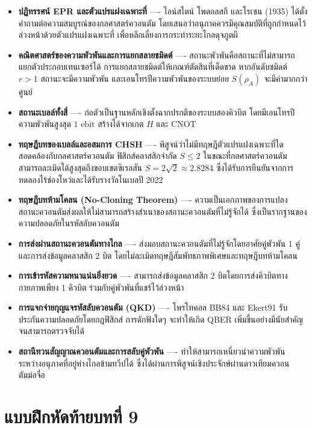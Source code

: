 \begin{itemize}
    \item \textbf{ปฏิทรรศน์ EPR และตัวแปรแฝงเฉพาะที่} ---- ไอน์สไตน์ โพดอลสกี และโรเซน (1935) ได้ตั้งคำถามต่อความสมบูรณ์ของกลศาสตร์ควอนตัม โดยเสนอว่าอนุภาคควรมีคุณสมบัติที่ถูกกำหนดไว้ล่วงหน้าด้วยตัวแปรแฝงเฉพาะที่ เพื่อหลีกเลี่ยงการกระทำระยะไกลดุจภูตผี
    \item \textbf{คณิตศาสตร์ของความพัวพันและการแยกสลายชมิดต์} ---- สถานะพัวพันคือสถานะที่ไม่สามารถแยกตัวประกอบเทนเซอร์ได้ การแยกสลายชมิดต์ให้เกณฑ์ตัดสินที่เด็ดขาด หากอันดับชมิดต์ $r > 1$ สถานะจะมีความพัวพัน และเอนโทรปีความพัวพันของระบบย่อย $S(\rho_A)$ จะมีค่ามากกว่าศูนย์
    \item \textbf{สถานะเบลล์ทั้งสี่} ---- ก่อตัวเป็นฐานหลักเชิงตั้งฉากปรกติของระบบสองคิวบิต โดยมีเอนโทรปีความพัวพันสูงสุด $1\text{ ebit}$ สร้างได้จากเกต $H$ และ CNOT
    \item \textbf{ทฤษฎีบทของเบลล์และอสมการ CHSH} ---- พิสูจน์ว่าไม่มีทฤษฎีตัวแปรแฝงเฉพาะที่ใดสอดคล้องกับกลศาสตร์ควอนตัม ฟิสิกส์คลาสสิกจำกัด $S \le 2$ ในขณะที่กลศาสตร์ควอนตัมสามารถละเมิดได้สูงสุดถึงขอบเขตซิเรลสัน $S = 2\sqrt{2} \approx 2.8284$ ซึ่งได้รับการยืนยันจากการทดลองไร้ช่องโหว่และได้รับรางวัลโนเบลปี 2022
    \item \textbf{ทฤษฎีบทห้ามโคลน (No-Cloning Theorem)} ---- ความเป็นเอกภาพของการแปลงสถานะควอนตัมส่งผลให้ไม่สามารถสร้างสำเนาของสถานะควอนตัมที่ไม่รู้จักได้ ซึ่งเป็นรากฐานของความปลอดภัยในรหัสลับควอนตัม
    \item \textbf{การส่งผ่านสถานะควอนตัมทางไกล} ---- ส่งมอบสถานะควอนตัมที่ไม่รู้จักโดยอาศัยคู่พัวพัน 1 คู่ และการส่งข้อมูลคลาสสิก 2 บิต โดยไม่ละเมิดทฤษฎีสัมพัทธภาพพิเศษและทฤษฎีบทห้ามโคลน
    \item \textbf{การเข้ารหัสความหนาแน่นยิ่งยวด} ---- สามารถส่งข้อมูลคลาสสิก 2 บิตโดยการส่งคิวบิตทางกายภาพเพียง 1 คิวบิต ร่วมกับคู่พัวพันที่แชร์ไว้ล่วงหน้า
    \item \textbf{การแจกจ่ายกุญแจรหัสลับควอนตัม (QKD)} ---- โพรโทคอล BB84 และ Ekert91 รับประกันความปลอดภัยโดยกฎฟิสิกส์ การดักฟังใดๆ จะทำให้เกิด QBER เพิ่มขึ้นอย่างมีนัยสำคัญจนสามารถตรวจจับได้
    \item \textbf{สถานีทวนสัญญาณควอนตัมและการสลับคู่พัวพัน} ---- ทำให้สามารถเหนี่ยวนำความพัวพันระหว่างอนุภาคที่อยู่ห่างไกลข้ามทวีปได้ ซึ่งได้ผ่านการพิสูจน์เชิงประจักษ์ผ่านดาวเทียมควอนตัมม่อจื่อ
\end{itemize}

\section*{แบบฝึกหัดท้ายบทที่ 9}

